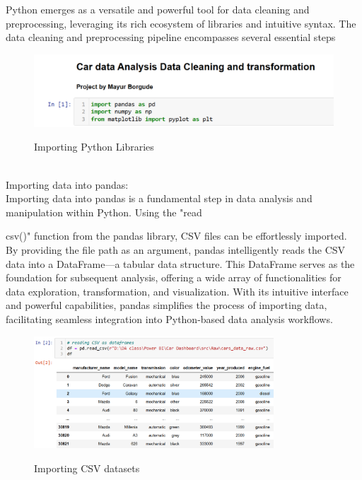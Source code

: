 \documentclass{article}
\begin{document}
{Python emerges as a versatile and powerful tool for data cleaning and preprocessing, leveraging its rich ecosystem of libraries and intuitive syntax. The data cleaning and preprocessing pipeline encompasses several essential steps
\begin{figure}[htbp]
  \centering
  \vspace{0.3cm}
  \includegraphics[width=1\textwidth]{Figures/Python/importing python libs.png}\\
  \caption{Importing Python Libraries}
  \vspace{0.3cm}
\end{figure}
\\
Importing data into pandas:
\\
Importing data into pandas is a fundamental step in data analysis and manipulation within Python. Using the 
"read\usepackage{textcomp}csv()"
function from the pandas library, CSV files can be effortlessly imported. By providing the file path as an argument, pandas intelligently reads the CSV data into a DataFrame—a tabular data structure. This DataFrame serves as the foundation for subsequent analysis, offering a wide array of functionalities for data exploration, transformation, and visualization. With its intuitive interface and powerful capabilities, pandas simplifies the process of importing data, facilitating seamless integration into Python-based data analysis workflows.
\\
\begin{figure}[htbp]
  \centering
  \vspace{0.3cm}
  \includegraphics[width=0.8\textwidth]{Figures/Python/reading the data from CSV.png}\\
  \caption{Importing CSV datasets}

\end{figure}}
\end{document}
